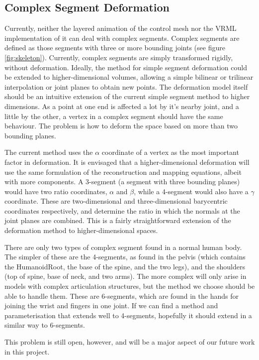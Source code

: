 \documentclass[10pt,oneside,fleqn,a4paper]{book}
\begin{document}
\subsection{\label{sec:vrmlcomplex}Complex Segment Deformation}
Currently, neither the layered animation of the control mesh nor the VRML implementation of it can deal with complex segments. Complex segments are defined as those segments with three or more bounding joints (see figure \ref{fig:skeleton}). Currently, complex segments are simply transformed rigidly, without deformation. Ideally, the method for simple segment deformation could be extended to higher-dimensional volumes, allowing a simple bilinear or trilinear interpolation or joint planes to obtain new points. The deformation model itself should be an intuitive extension of the current simple segment method to higher dimensions. As a point at one end is affected a lot by it's nearby joint, and a little by the other, a vertex in a complex segment should have the same behaviour. The problem is how to deform the space based on more than two bounding planes.

The current method uses the $\alpha$ coordinate of a vertex as the most important factor in deformation. It is envisaged that a higher-dimensional deformation will use the same formulation of the reconstruction and mapping equations, albeit with more components. A 3-segment (a segment with three bounding planes) would have two ratio coordinates, $\alpha$ and $\beta$, while a 4-segment would also have a $\gamma$ coordinate. These are two-dimensional and three-dimensional barycentric coordinates respectively, and determine the ratio in which the normals at the joint planes are combined. This is a fairly straightforward extension of the deformation method to higher-dimensional spaces. 

There are only two types of complex segment found in a normal human body. The simpler of these are the 4-segments, as found in the pelvis (which contains the HumanoidRoot, the base of the spine, and the two legs), and the shoulders (top of spine, base of neck, and two arms). The more complex will only arise in models with complex articulation structures, but the method we choose should be able to handle them. These are 6-segments, which are found in the hands for joining the wrist and fingers in one joint. If we can find a method and parameterisation that extends well to 4-segments, hopefully it should extend in a similar way to 6-segments.

This problem is still open, however, and will be a major aspect of our future work in this project.
\end{document}
